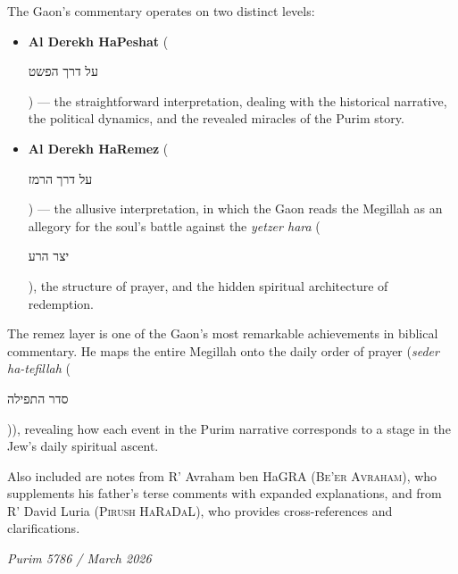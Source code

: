 \documentclass[11pt,twoside,openany]{book}
\newcommand{\heb}[1]{{\hebrewfont\begin{hebrew}#1\end{hebrew}}}
\newcommand{\hebterm}[2]{\textit{#1} (\heb{#2})}
\begin{document}
The Gaon's commentary operates on two distinct levels:

\begin{itemize}
\item \textbf{Al Derekh HaPeshat} (\heb{על דרך הפשט}) — the straightforward interpretation, dealing with the historical narrative, the political dynamics, and the revealed miracles of the Purim story.

\item \textbf{Al Derekh HaRemez} (\heb{על דרך הרמז}) — the allusive interpretation, in which the Gaon reads the Megillah as an allegory for the soul's battle against the \hebterm{yetzer hara}{יצר הרע}, the structure of prayer, and the hidden spiritual architecture of redemption.
\end{itemize}

The remez layer is one of the Gaon's most remarkable achievements in biblical commentary. He maps the entire Megillah onto the daily order of prayer (\hebterm{seder ha-tefillah}{סדר התפילה}), revealing how each event in the Purim narrative corresponds to a stage in the Jew's daily spiritual ascent.

Also included are notes from R' Avraham ben HaGRA (\textsc{Be'er Avraham}), who supplements his father's terse comments with expanded explanations, and from R' David Luria (\textsc{Pirush HaRaDaL}), who provides cross-references and clarifications.

\vspace{12pt}
\begin{flushright}
\textit{Purim 5786 / March 2026}
\end{flushright}

\tableofcontents

\mainmatter


% 
% 
% 
% 
% 
% 
% 
% 
% 
\end{document}
